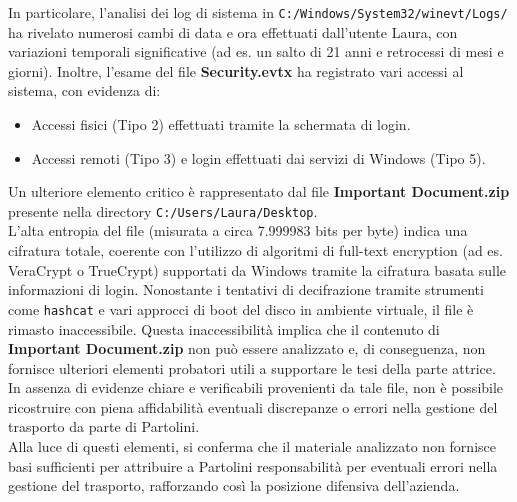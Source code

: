 In particolare, l’analisi dei log di sistema in \texttt{C:/Windows/System32/winevt/Logs/} ha rivelato numerosi cambi di data e ora effettuati dall’utente Laura, con variazioni temporali significative (ad es. un salto di 21 anni e retrocessi di mesi e giorni). Inoltre, l’esame del file \textbf{Security.evtx} ha registrato vari accessi al sistema, con evidenza di:
\begin{itemize}
    \item Accessi fisici (Tipo 2) effettuati tramite la schermata di login.
    \item Accessi remoti (Tipo 3) e login effettuati dai servizi di Windows (Tipo 5).
\end{itemize}
Un ulteriore elemento critico è rappresentato dal file \textbf{Important Document.zip} presente nella directory \texttt{C:/Users/Laura/Desktop}.\\ L’alta entropia del file (misurata a circa 7.999983 bits per byte) indica una cifratura totale, coerente con l’utilizzo di algoritmi di full-text encryption (ad es. VeraCrypt o TrueCrypt) supportati da Windows tramite la cifratura basata sulle informazioni di login. Nonostante i tentativi di decifrazione tramite strumenti come \texttt{hashcat} e vari approcci di boot del disco in ambiente virtuale, il file è rimasto inaccessibile.
Questa inaccessibilità implica che il contenuto di \textbf{Important Document.zip} non può essere analizzato e, di conseguenza, non fornisce ulteriori elementi probatori utili a supportare le tesi della parte attrice. \\In assenza di evidenze chiare e verificabili provenienti da tale file, non è possibile ricostruire con piena affidabilità eventuali discrepanze o errori nella gestione del trasporto da parte di Partolini.\vspace{14pt}\\
Alla luce di questi elementi, si conferma che il materiale analizzato non fornisce basi sufficienti per attribuire a Partolini responsabilità per eventuali errori nella gestione del trasporto, rafforzando così la posizione difensiva dell'azienda.
